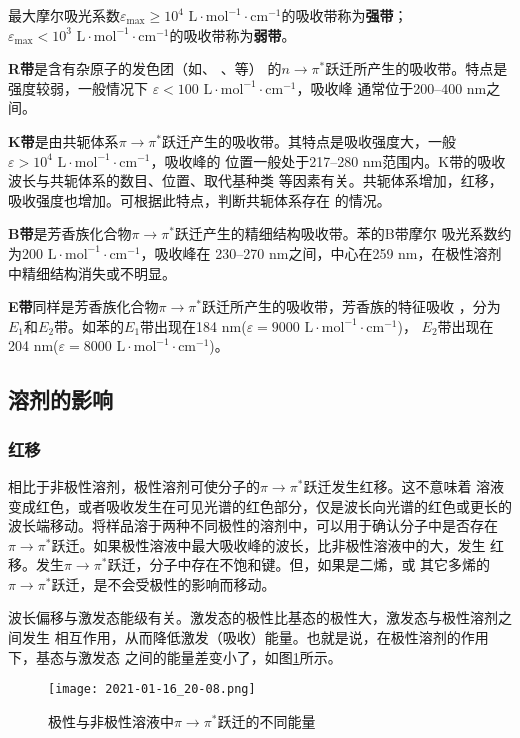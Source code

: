 最大摩尔吸光系数$\varepsilon_{\text{max}} \geq 10^4\text{ L}\cdot
\text{mol}^{-1}\cdot\text{cm}^{-1}$的吸收带称为{\bf 强带}；
$\varepsilon_{\text{max}} < 10^3\text{ L}\cdot
\text{mol}^{-1}\cdot\text{cm}^{-1}$的吸收带称为{\bf 弱带}。

{\bf R带}是含有杂原子的发色团（如、
、等）
的$n\to\pi^\ast$跃迁所产生的吸收带。特点是强度较弱，一般情况下
$\varepsilon < 100\text{ L}\cdot\text{mol}^{-1}\cdot\text{cm}^{-1}$，吸收峰
通常位于200--400 nm之间。

{\bf K带}是由共轭体系$\pi\to\pi^\ast$跃迁产生的吸收带。其特点是吸收强度大，一般
$\varepsilon > 10^4\text{ L}\cdot\text{mol}^{-1}\cdot\text{cm}^{-1}$，吸收峰的
位置一般处于217--280 nm范围内。K带的吸收波长与共轭体系的数目、位置、取代基种类
等因素有关。共轭体系增加，红移，吸收强度也增加。可根据此特点，判断共轭体系存在
的情况。

{\bf B带}是芳香族化合物$\pi\to\pi^\ast$跃迁产生的精细结构吸收带。苯的B带摩尔
吸光系数约为$200 \text{ L}\cdot\text{mol}^{-1}\cdot\text{cm}^{-1}$，吸收峰在
230--270 nm之间，中心在259 nm，在极性溶剂中精细结构消失或不明显。

{\bf E带}同样是芳香族化合物$\pi\to\pi^\ast$跃迁所产生的吸收带，芳香族的特征吸收
，分为$E_1$和$E_2$带。如苯的$E_1$带出现在184 nm($\varepsilon=9000 \text{ L}
\cdot\text{mol}^{-1}\cdot\text{cm}^{-1}$)，
$E_2$带出现在204 nm($\varepsilon=8000 \text{ L} \cdot\text{mol}^{-1}
\cdot\text{cm}^{-1}$)。
\subsection{溶剂的影响}
\subsubsection{红移}
相比于非极性溶剂，极性溶剂可使分子的$\pi\to\pi^\ast$跃迁发生红移。这不意味着
溶液变成红色，或者吸收发生在可见光谱的红色部分，仅是波长向光谱的红色或更长的
波长端移动。将样品溶于两种不同极性的溶剂中，可以用于确认分子中是否存在
$\pi\to\pi^\ast$跃迁。如果极性溶液中最大吸收峰的波长，比非极性溶液中的大，发生
红移。发生$\pi\to\pi^\ast$跃迁，分子中存在不饱和键。但，如果是二烯，或
其它多烯的$\pi\to\pi^\ast$跃迁，是不会受极性的影响而移动。

波长偏移与激发态能级有关。激发态的极性比基态的极性大，激发态与极性溶剂之间发生
相互作用，从而降低激发（吸收）能量。也就是说，在极性溶剂的作用下，基态与激发态
之间的能量差变小了，如图\ref{fig:5.39}所示。
\begin{figure}[htpb]
    \centering
    \texttt{[image: 2021-01-16\_20-08.png]}
    \caption{极性与非极性溶液中$\pi\to\pi^\ast$跃迁的不同能量}
    \label{fig:5.39}
\end{figure}

